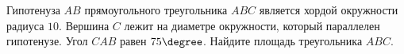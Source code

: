 \begin{ex}
	\begin{condition}
		Гипотенуза \( AB  \) прямоугольного треугольника \( ABC  \) является хордой окружности радиуса \( 10 \). Вершина \( C  \) лежит на диаметре окружности, который параллелен гипотенузе. Угол \( CAB  \) равен \( 75\degree\). Найдите площадь треугольника \( ABC \).
	\end{condition}
\end{ex}